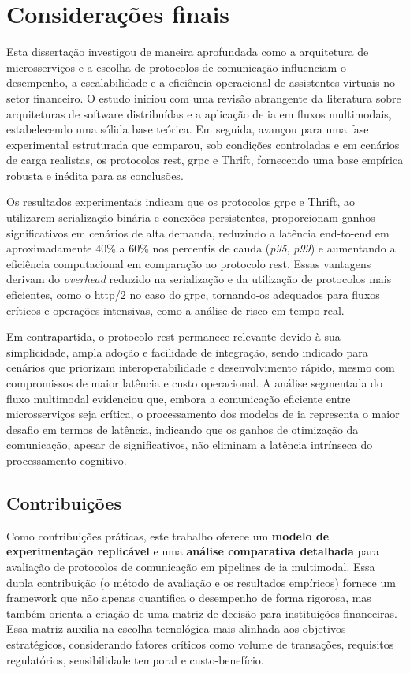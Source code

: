 \chapter{Considerações finais}
\label{ch:6conclusoes}

Esta dissertação investigou de maneira aprofundada como a arquitetura de microsserviços e a escolha de protocolos de comunicação influenciam o desempenho, a escalabilidade e a eficiência operacional de assistentes virtuais no setor financeiro. O estudo iniciou com uma revisão abrangente da literatura sobre arquiteturas de software distribuídas e a aplicação de \acrfull{ia} em fluxos multimodais, estabelecendo uma sólida base teórica. Em seguida, avançou para uma fase experimental estruturada que comparou, sob condições controladas e em cenários de carga realistas, os protocolos \gls{rest}, \gls{grpc} e Thrift, fornecendo uma base empírica robusta e inédita para as conclusões.

Os resultados experimentais indicam que os protocolos \gls{grpc} e Thrift, ao utilizarem serialização binária e conexões persistentes, proporcionam ganhos significativos em cenários de alta demanda, reduzindo a latência end-to-end em aproximadamente 40\% a 60\% nos percentis de cauda (\textit{p95}, \textit{p99}) e aumentando a eficiência computacional em comparação ao protocolo \gls{rest}. Essas vantagens derivam do \textit{overhead} reduzido na serialização e da utilização de protocolos mais eficientes, como o \acrshort{http}/2 no caso do \gls{grpc}, tornando-os adequados para fluxos críticos e operações intensivas, como a análise de risco em tempo real.

Em contrapartida, o protocolo \gls{rest} permanece relevante devido à sua simplicidade, ampla adoção e facilidade de integração, sendo indicado para cenários que priorizam interoperabilidade e desenvolvimento rápido, mesmo com compromissos de maior latência e custo operacional. A análise segmentada do fluxo multimodal evidenciou que, embora a comunicação eficiente entre microsserviços seja crítica, o processamento dos modelos de \gls{ia} representa o maior desafio em termos de latência, indicando que os ganhos de otimização da comunicação, apesar de significativos, não eliminam a latência intrínseca do processamento cognitivo.

\section{Contribuições}
Como contribuições práticas, este trabalho oferece um \textbf{modelo de experimentação replicável} e uma \textbf{análise comparativa detalhada} para avaliação de protocolos de comunicação em pipelines de \acrfull{ia} multimodal. Essa dupla contribuição (o método de avaliação e os resultados empíricos) fornece um framework que não apenas quantifica o desempenho de forma rigorosa, mas também orienta a criação de uma matriz de decisão para instituições financeiras. Essa matriz auxilia na escolha tecnológica mais alinhada aos objetivos estratégicos, considerando fatores críticos como volume de transações, requisitos regulatórios, sensibilidade temporal e custo-benefício.

